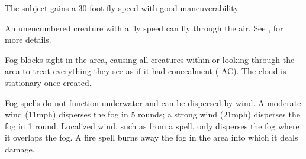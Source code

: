 \spellrng{\rngtouch}
\spelldur{\durshort}
\begin{spelleffect}
    The subject gains a 30 foot fly speed with good maneuverability.
\end{spelleffect}
\begin{spellnotes}
    An unencumbered creature with a fly speed can fly through the air. See , for more details.
\end{spellnotes}

\spellrng{\rngmed}
\spelldur{\durshort}
\begin{spelleffect}
    Fog blocks sight in the area, causing all creatures within or looking through the area to treat everything they see as if it had concealment ( AC). The cloud is stationary once created.
\end{spelleffect}
\begin{spellnotes}
    Fog spells do not function underwater and can be dispersed by wind. A moderate wind (11\add mph) disperses the fog in 5 rounds; a strong wind (21\add mph) disperses the fog in 1 round. Localized wind, such as from a  spell, only disperses the fog where it overlaps the fog. A fire spell burns away the fog in the area into which it deals damage.
\end{spellnotes}

